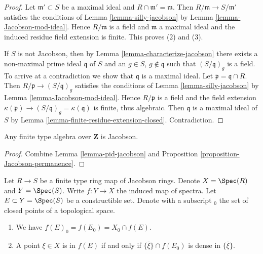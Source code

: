 \begin{proof}
Let $\mathfrak m' \subset S$ be a maximal ideal and
$R \cap \mathfrak m' = \mathfrak m$.
Then $R/\mathfrak m \to S/\mathfrak m'$ satisfies
the conditions of Lemma \ref{lemma-silly-jacobson}
by Lemma \ref{lemma-Jacobson-mod-ideal}.
Hence $R/\mathfrak m$ is a field and
$\mathfrak m$ a maximal ideal and the induced
residue field extension is finite. This proves (2) and (3).  

\medskip\noindent
If $S$ is not Jacobson, then by Lemma \ref{lemma-characterize-jacobson} there
exists a non-maximal prime ideal $\mathfrak q$ of $S$ and an
$g \in S$, $g \not\in \mathfrak q$ such that $(S/\mathfrak q)_g$ is a field.
To arrive at a contradiction we show that $\mathfrak q$ is a maximal ideal.
Let $\mathfrak p = \mathfrak q \cap R$. Then
$R/\mathfrak p \to (S/\mathfrak q)_g$ satisfies the conditions of
Lemma \ref{lemma-silly-jacobson} by
Lemma \ref{lemma-Jacobson-mod-ideal}.
Hence $R/\mathfrak p$ is a field and the field extension
$\kappa(\mathfrak p) \to (S/\mathfrak q)_g = \kappa(\mathfrak q)$ is
finite, thus algebraic. Then $\mathfrak q$ is a maximal ideal of $S$ by
Lemma \ref{lemma-finite-residue-extension-closed}. Contradiction.
\end{proof}

\begin{lemma}
\label{lemma-corollary-jacobson}
Any finite type algebra over $\mathbf{Z}$ is Jacobson.
\end{lemma}

\begin{proof}
Combine Lemma \ref{lemma-pid-jacobson} and
Proposition \ref{proposition-Jacobson-permanence}.
\end{proof}

\begin{lemma}
\label{lemma-image-finite-type-map-Jacobson-rings}
Let $R \to S$ be a finite type ring map of Jacobson rings.
Denote $X = \Spec(R)$ and $Y = \Spec(S)$.
Write $f : Y \to X$ the induced
map of spectra. Let $E \subset Y = \Spec(S)$ be a
constructible set. Denote with a subscript ${}_0$ the set
of closed points of a topological space.
\begin{enumerate}
\item We have $f(E)_0 = f(E_0) = X_0 \cap f(E)$.
\item A point $\xi \in X$ is in $f(E)$ if and only if
$\overline{\{\xi\}} \cap f(E_0)$ is dense in $\overline{\{\xi\}}$.
\end{enumerate}
\end{lemma}

